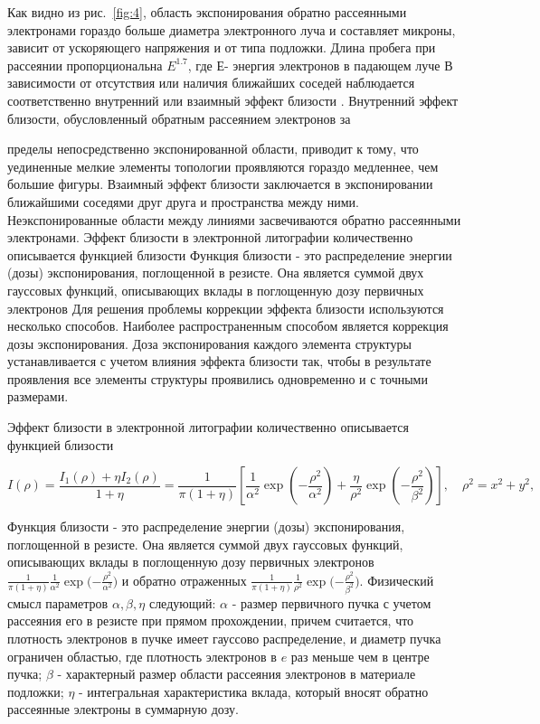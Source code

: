 Как видно из рис.~\ref{fig:4}, область экспонирования обратно рассеянными электронами гораздо больше диаметра электронного луча и составляет микроны, зависит от ускоряющего напряжения и от типа подложки. Длина пробега при рассеянии пропорциональна $E^{1.7}$, где Е- энергия электронов в падающем луче
В зависимости от отсутствия или наличия ближайших соседей наблюдается соответственно внутренний или взаимный эффект близости . Внутренний эффект близости, обусловленный обратным рассеянием электронов за

пределы непосредственно экспонированной области, приводит к тому, что уединенные мелкие элементы топологии проявляются гораздо медленнее, чем большие фигуры. Взаимный эффект близости заключается в экспонировании ближайшими соседями друг друга и пространства между ними. Неэкспонированные области между линиями засвечиваются обратно рассеянными электронами.
Эффект близости в электронной литографии количественно описывается функцией близости
Функция близости - это распределение энергии (дозы) экспонирования, поглощенной в резисте. Она является суммой двух гауссовых функций, описывающих вклады в поглощенную дозу первичных электронов
Для решения проблемы коррекции эффекта близости используются несколько способов. Наиболее распространенным способом является коррекция дозы экспонирования. Доза экспонирования каждого элемента структуры устанавливается с учетом влияния эффекта близости так, чтобы в результате проявления все элементы структуры проявились одновременно и с точными размерами.

Эффект близости в электронной литографии количественно описывается функцией близости

\begin{equation}
I(\rho)=\frac{I_1 (\rho)+ \eta I_2(\rho)}{1+\eta}=\frac{1}{\pi(1+\eta)}\left[\frac{1}{\alpha^2}\exp\left(-\frac{\rho^2}{\alpha^2}\right)+\frac{\eta}{\rho^2}\exp\left(-\frac{\rho^2}{\beta^2}\right)\right],\quad \rho^2 = x^2 + y^2,
\label{eq:A8}
\end{equation}

Функция близости - это распределение энергии (дозы) экспонирования, поглощенной в резисте. Она является суммой двух гауссовых функций, описывающих вклады в поглощенную дозу первичных электронов
$\frac{1}{\pi(1+\eta)} \frac{1}{\alpha^2} \exp{(}-\frac{\rho^2}{\alpha^2}{)} $ и обратно отраженных $\frac{1}{\pi(1+\eta)} \frac{1}{\rho^2} \exp {(}-\frac{\rho^2}{\beta^2}{)}$. 
Физический смысл параметров $\alpha,\beta,\eta$ следующий: $\alpha$ - размер первичного пучка с учетом рассеяния его в резисте при прямом прохождении, причем считается, что плотность электронов в пучке имеет гауссово распределение, и диаметр пучка ограничен областью, где плотность электронов в $e$ раз меньше чем в центре пучка; $\beta$ - характерный размер области рассеяния электронов в материале подложки; $\eta$ - интегральная характеристика вклада, который вносят обратно рассеянные электроны в суммарную дозу.


